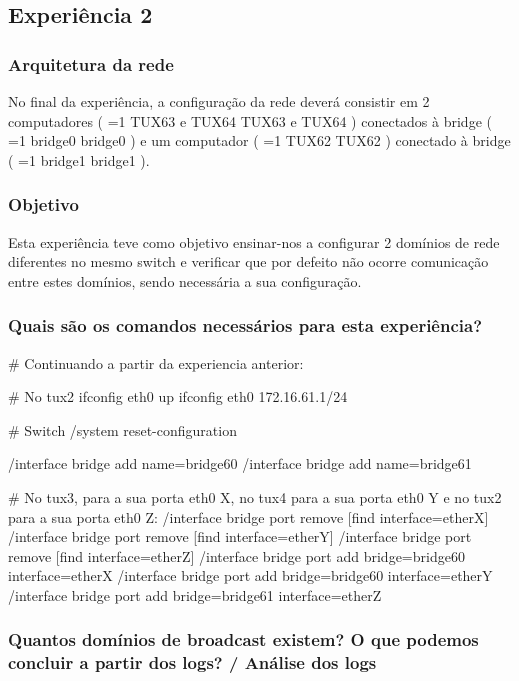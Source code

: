 \documentclass[11pt,a4paper,twocolumn]{article}
\newcommand{\hl}[2][1]{%
  \ifnum#1=1\relax
    \textcolor{text-hl1}{#2}%
  \else
    \textcolor{text-hl2}{#2}%
  \fi
}
\begin{document}
\subsection{Experiência 2}

\subsubsection{Arquitetura da rede}

No final da experiência, a configuração da rede deverá consistir em 2 computadores (\hl[2]{TUX63 e TUX64}) conectados à bridge (\hl[2]{bridge0}) e um computador (\hl[2]{TUX62}) conectado à bridge (\hl[2]{bridge1}). 

\subsubsection{Objetivo}

Esta experiência teve como objetivo ensinar-nos a configurar 2 domínios de rede diferentes no mesmo switch e verificar que por defeito não ocorre comunicação entre estes domínios, sendo necessária a sua configuração.

\subsubsection{Quais são os comandos necessários para esta experiência?}

\begin{bash-darktheme}
    # Continuando a partir da experiencia anterior:

    # No tux2
    ifconfig eth0 up
    ifconfig eth0 172.16.61.1/24

    # Switch
    /system reset-configuration

    /interface bridge add name=bridge60
    /interface bridge add name=bridge61

    # No tux3, para a sua porta eth0 X, no tux4 para a sua porta eth0 Y e no tux2 para a sua porta eth0 Z:
    /interface bridge port remove [find interface=etherX]
    /interface bridge port remove [find interface=etherY]
    /interface bridge port remove [find interface=etherZ]
    /interface bridge port add bridge=bridge60 interface=etherX
    /interface bridge port add bridge=bridge60 interface=etherY
    /interface bridge port add bridge=bridge61 interface=etherZ
\end{bash-darktheme}

\subsubsection{ Quantos domínios de broadcast existem? O que podemos concluir a partir dos logs? / Análise dos logs}
\end{document}
